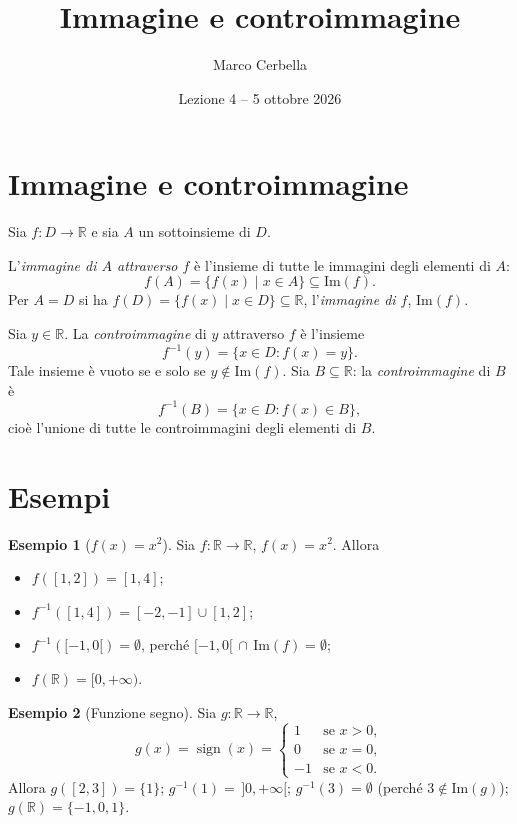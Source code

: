 \documentclass[11pt,a4paper]{article}
\title{Immagine e controimmagine}
\author{Marco Cerbella}
\date{Lezione 4 -- 5 ottobre 2026}
\theoremstyle{definition}
\newtheorem*{esempio}{Esempio}
\begin{document}
\maketitle

\section{Immagine e controimmagine}

Sia $f : D \to \mathbb{R}$ e sia $A$ un sottoinsieme di $D$.

\begin{definizione}
L'\emph{immagine di $A$ attraverso $f$} è l'insieme di tutte le immagini degli elementi di $A$:
\[
f(A) = \{f(x) \mid x \in A\} \subseteq \mathrm{Im}(f).
\]
Per $A = D$ si ha $f(D) = \{f(x) \mid x \in D\} \subseteq \mathbb{R}$, l'\emph{immagine di $f$}, $\mathrm{Im}(f)$.
\end{definizione}

\begin{definizione}
Sia $y \in \mathbb{R}$. La \emph{controimmagine} di $y$ attraverso $f$ è l'insieme
\[
f^{-1}(y) = \{x \in D : f(x) = y\}.
\]
Tale insieme è vuoto se e solo se $y \notin \mathrm{Im}(f)$. Sia $B \subseteq \mathbb{R}$: la \emph{controimmagine} di $B$ è
\[
f^{-1}(B) = \{x \in D : f(x) \in B\},
\]
cioè l'unione di tutte le controimmagini degli elementi di $B$.
\end{definizione}

\section{Esempi}

\begin{esempio}[$f(x) = x^2$]
Sia $f : \mathbb{R} \to \mathbb{R}$, $f(x) = x^2$. Allora
\begin{itemize}
    \item $f([1, 2]) = [1, 4]$;
    \item $f^{-1}([1, 4]) = [-2, -1] \cup [1, 2]$;
    \item $f^{-1}([-1, 0[) = \emptyset$, perché $[-1, 0[ \,\cap\, \mathrm{Im}(f) = \emptyset$;
    \item $f(\mathbb{R}) = [0, +\infty)$.
\end{itemize}
\end{esempio}

\begin{esempio}[Funzione segno]
Sia $g : \mathbb{R} \to \mathbb{R}$,
\[
g(x) = \operatorname{sign}(x) = \begin{cases} 1 & \text{se } x > 0, \\ 0 & \text{se } x = 0, \\ -1 & \text{se } x < 0. \end{cases}
\]
Allora $g([2, 3]) = \{1\}$; $g^{-1}(1) = \,]0, +\infty[$; $g^{-1}(3) = \emptyset$ (perché $3 \notin \mathrm{Im}(g)$); $g(\mathbb{R}) = \{-1, 0, 1\}$.
\end{esempio}
\end{document}
